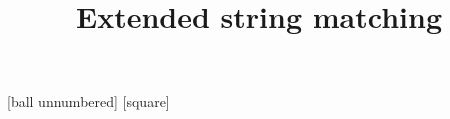 \usepackage{bxdpx-beamer} %
\usepackage{pxjahyper} %
\usepackage{minijs} %
\usepackage{latexsym}
\usepackage[deluxe,expert]{otf}
\renewcommand{\kanjifamilydefault}{\gtdefault} %

\usepackage{tikz}
\usetikzlibrary{calc,decorations.pathreplacing,quotes,positioning,shapes,fit,arrows,backgrounds,tikzmark}

\usepackage{standalone}
\usepackage{import}

\usepackage{xcolor}
[ball unnumbered]
[square]

\usepackage[T1]{fontenc}%
\usepackage[utf8]{inputenc}%
\usepackage{txfonts}%
\usepackage{bm}%

\usepackage{amsmath,amssymb}
\usepackage{amsthm}
\usepackage{algorithm, algpseudocode}
\usepackage{enumitem}

\newcommand{\func}[1]{\ensuremath\mathrm{#1}}
\newcommand{\Scatter}{\text{\scshape Scatter}}
\newcommand{\Gather}{\text{\textsc{Gather}}}
\newcommand{\Propagate}{\func{\text{\textsc{Propagate}}}}
\newcommand{\ShiftAnd}{\textbf{Shift-And}}
\newcommand{\BNDM}{\textbf{BNDM}}
\providecommand{\as}{\textasteriskcentered}
\providecommand{\pl}{\text{+}}

\providecommand{\ImportStandalone}[3]{
	\IfStandalone{
		{#3}
		}{
		{#3}
	}
}

\title{Extended string matching}
\institute{北海道大学　%
}
\author{%
}
